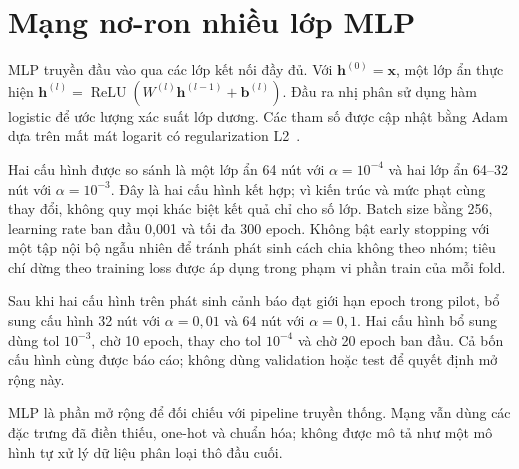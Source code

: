 \section{Mạng nơ-ron nhiều lớp MLP}
\label{sec:2_5}
MLP truyền đầu vào qua các lớp kết nối đầy đủ. Với $\mathbf{h}^{(0)}=\mathbf{x}$, một lớp ẩn thực hiện $\mathbf{h}^{(l)}=\operatorname{ReLU}(W^{(l)}\mathbf{h}^{(l-1)}+\mathbf{b}^{(l)})$. Đầu ra nhị phân sử dụng hàm logistic để ước lượng xác suất lớp dương. Các tham số được cập nhật bằng Adam dựa trên mất mát logarit có regularization L2~\cite{sklearn-mlp}.

Hai cấu hình được so sánh là một lớp ẩn 64 nút với $\alpha=10^{-4}$ và hai lớp ẩn 64--32 nút với $\alpha=10^{-3}$. Đây là hai cấu hình kết hợp; vì kiến trúc và mức phạt cùng thay đổi, không quy mọi khác biệt kết quả chỉ cho số lớp. Batch size bằng 256, learning rate ban đầu 0,001 và tối đa 300 epoch. Không bật early stopping với một tập nội bộ ngẫu nhiên để tránh phát sinh cách chia không theo nhóm; tiêu chí dừng theo training loss được áp dụng trong phạm vi phần train của mỗi fold.

Sau khi hai cấu hình trên phát sinh cảnh báo đạt giới hạn epoch trong pilot, bổ sung cấu hình 32 nút với $\alpha=0{,}01$ và 64 nút với $\alpha=0{,}1$. Hai cấu hình bổ sung dùng tol $10^{-3}$, chờ 10 epoch, thay cho tol $10^{-4}$ và chờ 20 epoch ban đầu. Cả bốn cấu hình cùng được báo cáo; không dùng validation hoặc test để quyết định mở rộng này.

MLP là phần mở rộng để đối chiếu với pipeline truyền thống. Mạng vẫn dùng các đặc trưng đã điền thiếu, one-hot và chuẩn hóa; không được mô tả như một mô hình tự xử lý dữ liệu phân loại thô đầu cuối.
